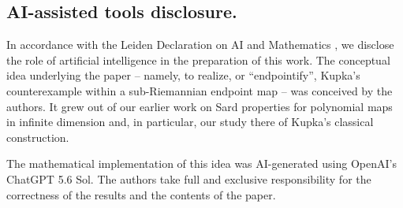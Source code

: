 \documentclass[11pt]{amsart}
\numberwithin{equation}{section}
\theoremstyle{remark}
\begin{document}
\subsection*{AI-assisted tools disclosure.}
In accordance with the Leiden Declaration on AI
and Mathematics \cite{LeidenDeclaration}, we disclose the role of
artificial intelligence in the preparation of this work.  The
conceptual idea underlying the paper -- namely, to realize, or
``endpointify'', Kupka's counterexample within a sub-Riemannian endpoint
map -- was conceived by the authors.  It grew out of our earlier work on
Sard properties for polynomial maps in infinite dimension \cite{LRT}
and, in particular, our study there of Kupka's classical construction.

The mathematical implementation of this idea was AI-generated using
OpenAI's ChatGPT 5.6 Sol.  The authors take full and
exclusive responsibility for the correctness of the results and the
contents of the paper.



\end{document}
